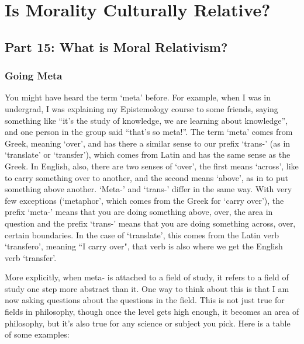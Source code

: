 \part{Is Morality Culturally Relative?}
\label{ch.modseven}

\chapter{Part 15: What is Moral Relativism?}
\section{Going Meta}

You might have heard the term ‘meta’ before. For example, when I was in undergrad, I was explaining my Epistemology course to some friends, saying something like “it’s the study of knowledge, we are learning about knowledge”, and one person in the group said “that’s so meta!”. The term ‘meta’ comes from Greek, meaning ‘over’, and has there a similar sense to our prefix ‘trans-’ (as in ‘translate’ or ‘transfer’), which comes from Latin and has the same sense as the Greek. In English, also, there are two senses of ‘over’, the first means ‘across’, like to carry something over to another, and the second means ‘above’, as in to put something above another. ‘Meta-’ and ‘trans-’ differ in the same way. With very few exceptions (‘metaphor’, which comes from the Greek for ‘carry over’), the prefix ‘meta-’ means that you are doing something above, over, the area in question and the prefix ‘trans-’ means that you are doing something across, over, certain boundaries. In the case of `translate', this comes from the Latin verb `transfero', meaning ``I carry over", that verb is also where we get the English verb `transfer'.

More explicitly, when \gls{meta-} is attached to a field of study, it refers to a field of study one step more abstract than it. One way to think about this is that I am now asking questions about the questions in the field. This is not just true for fields in philosophy, though once the level gets high enough, it becomes an area of philosophy, but it’s also true for any science or subject you pick. Here is a table of some examples:

